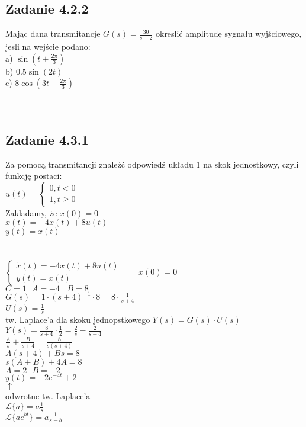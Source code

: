 \pagebreak
\subsection*{Zadanie 4.2.2} {\color{darkgray}
	Mając dana transmitancje $G(s)=\frac{30}{s+2}$ okreslić amplitudę sygnału wyjściowego, jesli na wejście podano:\\
	a) $\sin(t+\frac{2 \pi}{3})$\\
	b) $0.5\sin(2t)$\\
	c) $8\cos(3t+\frac{2\pi}{3})$\\
}\lineh
\\\\

\pagebreak
\subsection*{Zadanie 4.3.1} {\color{darkgray}
	Za pomocą transmitancji znaleźć odpowiedź układu 1 na skok jednostkowy, czyli funkcję postaci:\\
	$u(t)=\begin{cases}0,t<0 \\ 1, t\geqslant 0 \end{cases}$\\
	Zakladamy, że $x(0)=0$\\
	$\dot{x}(t)=-4x(t)+8u(t)$\\
	$y(t)=x(t)$\\
}\lineh
\\\\
$\begin{cases}\dot{x}(t)=-4x(t)+8u(t)\\y(t)=x(t) \end{cases} \ \ \ \ \ \ \ \ \ x(0)=0$\\
$C=1 \ \ \ A=-4 \ \ \ \ B=8$\\
$G(s)=1 \cdot (s+4)^{-1} \cdot 8 = 8 \cdot \frac{1}{s+4}$\\
$U(s)=\frac 1 s \ \ \ $\\ tw. Laplace'a dla skoku jednopstkowego
$Y(s)=G(s) \cdot U(s)$\\
$Y(s)=\frac{8}{s+4} \cdot \frac{1}{2} = \frac{2}{s} - \frac{2}{s+4}$\\
$\frac{A}{s}+\frac{B}{s+4}=\frac{8}{s(s+4)}$\\
$A(s+4)+Bs=8$\\
$s(A+B)+4A=8$\\
$A=2 \ \ \ B=-2$\\
$\boxed{y(t)=-2e^{-4t}+2}$\\ 
$\uparrow$\\
odwrotne tw. Laplace'a\\
$\mathcal{L}\{a\}=a\frac 1 s$\\
$\mathcal{L}\{ae^{bt}\}=a\frac {1}{s-b}$\\


